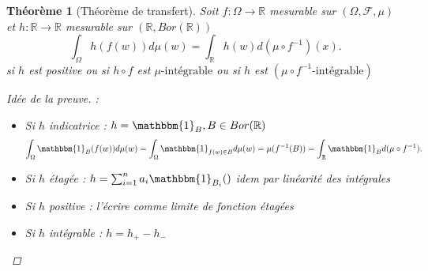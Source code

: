 \documentclass{article}
\theoremstyle{plain}%
\newtheorem{thm}{Théorème}[section]
\theoremstyle{definition}
\theoremstyle{remark}
\begin{document}
    \begin{thm}[Théorème de transfert]
        Soit $ f: \Omega \to \mathbb{R} $ mesurable sur $ (\Omega, \mathcal{F}, \mu ) $ et $ h : \mathbb{R} \to \mathbb{R} $ mesurable sur $ (\mathbb{R}, Bor(\mathbb{R})) $
        \[
            \int_{\Omega }^{}h(f(w))d \mu (w) = \int_{\mathbb{R}}^{} h(w) d (\mu \circ f^{-1})(x)
        .\]
        si $ h $ est positive ou si $ h \circ f $ est $ \mu \text{-intégrable} $ ou si $ h $ est $ (\mu \circ f^{-1}\text{-intégrable}) $ 

        \begin{proof}[Idée de la preuve]
            :\\
            \begin{itemize}
                \item Si $ h $ indicatrice : $ h= \mathbbm{1}_{B}, B \in Bor(\mathbb{R}) $ 
                \[
                    \int_{\Omega }^{}\mathbbm{1}_{B}(f(w))d \mu (w) = \int_{\Omega }^{}\mathbbm{1}_{f(w) \in B}d \mu (w) = \mu (f^{-1} (B) ) = \int_{\mathbb{R}}^{}\mathbbm{1}_{B}d (\mu \circ f^{-1})
                .\]
                \item Si $ h $ étagée : $ h = \sum_{i=1}^{n}a_i \mathbbm{1}_{B_i}() $ idem par linéarité des intégrales 
                \item Si $ h $ positive : l'écrire comme limite de fonction étagées
                \item Si $ h $ intégrable : $ h = h_+ - h_- $ 
            \end{itemize}
        \end{proof}       
    \end{thm}
    
\end{document}
